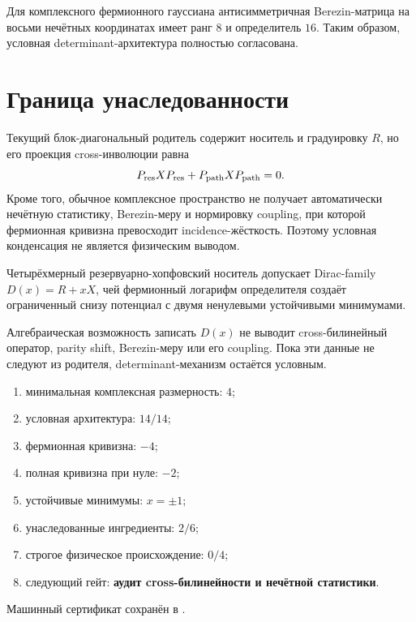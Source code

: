 Для комплексного фермионного гауссиана антисимметричная Berezin-матрица
на восьми нечётных координатах имеет ранг $8$ и определитель $16$.
Таким образом, условная determinant-архитектура полностью согласована.

\section{Граница унаследованности}

Текущий блок-диагональный родитель содержит носитель и градуировку $R$, но
его проекция cross-инволюции равна
\begin{equation}
 P_{\rm res}XP_{\rm res}+P_{\rm path}XP_{\rm path}=0.
\end{equation}
Кроме того, обычное комплексное пространство не получает автоматически
нечётную статистику, Berezin-меру и нормировку coupling, при которой
фермионная кривизна превосходит incidence-жёсткость. Поэтому условная
конденсация не является физическим выводом.

\begin{theorem}
Четырёхмерный резервуарно-хопфовский носитель допускает Dirac-family
$D(x)=R+xX$, чей фермионный логарифм определителя создаёт ограниченный
снизу потенциал с двумя ненулевыми устойчивыми минимумами.
\end{theorem}

\begin{nogocriterion}
Алгебраическая возможность записать $D(x)$ не выводит cross-билинейный
оператор, parity shift, Berezin-меру или его coupling. Пока эти данные не
следуют из родителя, determinant-механизм остаётся условным.
\end{nogocriterion}

\begin{protocol}\begin{enumerate}
\item минимальная комплексная размерность: \textbf{$4$};
\item условная архитектура: \textbf{$14/14$};
\item фермионная кривизна: \textbf{$-4$};
\item полная кривизна при нуле: \textbf{$-2$};
\item устойчивые минимумы: \textbf{$x=\pm1$};
\item унаследованные ингредиенты: \textbf{$2/6$};
\item строгое физическое происхождение: \textbf{$0/4$};
\item следующий гейт: \textbf{аудит cross-билинейности и нечётной статистики}.
\end{enumerate}\end{protocol}

Машинный сертификат сохранён в
.